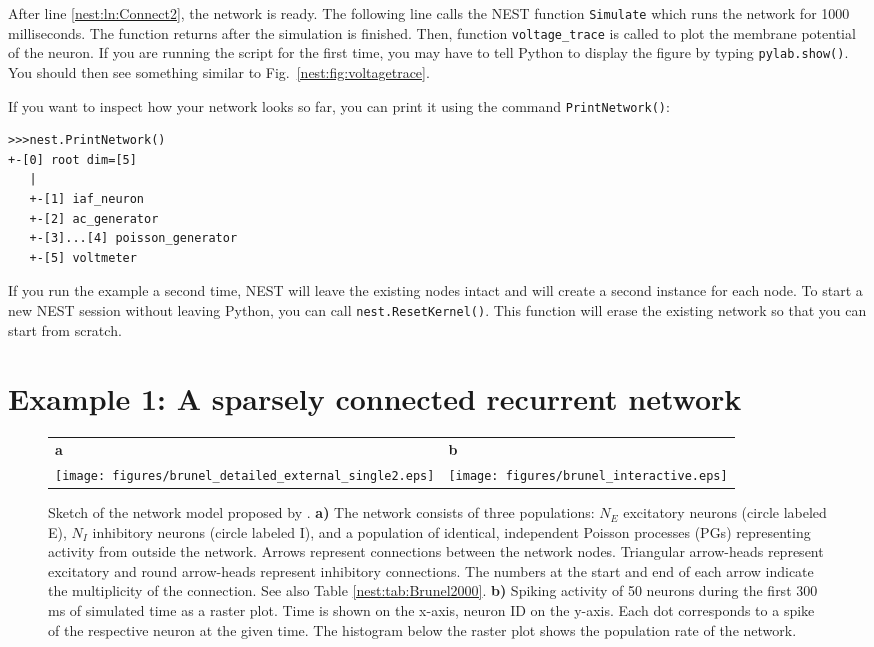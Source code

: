 \documentclass{article}
\begin{document}
After line \ref{nest:ln:Connect2}, the network is ready. The following
line calls the NEST function \lstinline!Simulate! which runs the
network for 1000 milliseconds. The function returns after the
simulation is finished. Then, function \lstinline!voltage_trace! is
called to plot the membrane potential of the neuron. If you are
running the script for the first time, you may have to tell Python to display
the figure by typing \lstinline!pylab.show()!. You should then see
something similar to Fig.~\ref{nest:fig:voltagetrace}.

If you want to inspect how your network looks so far, you can print
it using the command \lstinline!PrintNetwork()!:

\begin{lstlisting}[numbers=none]
>>>nest.PrintNetwork()
+-[0] root dim=[5]
   |
   +-[1] iaf_neuron
   +-[2] ac_generator
   +-[3]...[4] poisson_generator
   +-[5] voltmeter
\end{lstlisting}

If you run the example a second time, NEST will leave the existing
nodes intact and will create a second instance for each node. To start
a new NEST session without leaving Python, you can call
\lstinline!nest.ResetKernel()!. This function will erase the existing
network so that you can start from scratch.

\section{Example 1: A sparsely connected recurrent network}
\label{nest:sec:brunel}
\begin{figure}[!htb]
\centering
\begin{tabular}{ll}
\textbf{a} & \textbf{b}\\
\texttt{[image: figures/brunel\_detailed\_external\_single2.eps]}&
\texttt{[image: figures/brunel\_interactive.eps]}
\end{tabular}

\caption{\label{nest:fig:brunel2000} Sketch of the network model
  proposed by \citet{Brunel00}. \textbf{a)} The network consists of
  three populations: $N_E$ excitatory neurons (circle labeled E), $N_I$
  inhibitory neurons (circle labeled I), and a
  population of identical, independent Poisson processes (PGs) representing
  activity from outside the network. Arrows represent connections
  between the network nodes. Triangular arrow-heads represent
  excitatory and round arrow-heads represent inhibitory
  connections. The numbers at the start and end of each arrow indicate
  the multiplicity of the connection. See also Table
  \ref{nest:tab:Brunel2000}. \textbf{b)} Spiking activity of 50 neurons
  during the first 300 ms of simulated time as a raster plot. Time is
  shown on the x-axis, neuron ID on the y-axis. Each dot corresponds
  to a spike of the respective neuron at the given time. The histogram
  below the raster plot shows the population rate of the network.}
\end{figure}
\end{document}
